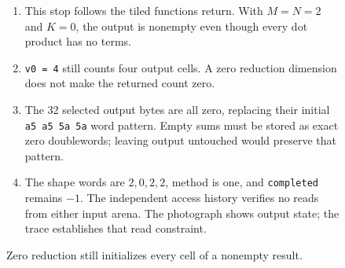 \begin{figure}[htbp]
  \par\smallskip
  \begin{minipage}{\linewidth}
    \small
    \begin{enumerate}
      \setlength{\itemsep}{2pt}
            \setlength{\parsep}{0pt}
      \item This stop follows the tiled function\textquotesingle s return. With $M=N=2$ and $K=0$, the output is nonempty even though every dot product has no terms.
      \item \texttt{v0 = 4} still counts four output cells. A zero reduction dimension does not make the returned count zero.
      \item The 32 selected output bytes are all zero, replacing their initial \texttt{a5 a5 5a 5a} word pattern. Empty sums must be stored as exact zero doublewords; leaving output untouched would preserve that pattern.
      \item The shape words are $2,0,2,2$, method is one, and \texttt{completed} remains $-1$. The independent access history verifies no reads from either input arena. The photograph shows output state; the trace establishes that read constraint.
    \end{enumerate}
  \end{minipage}
  \caption{Zero reduction still initializes every cell of a nonempty result.}
  \label{capture:022-blocked-matmul-f02}
  \label{matmul-f02}
\end{figure}
\par
